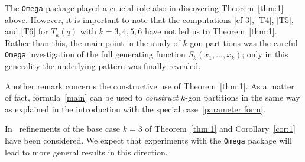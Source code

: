 \documentclass[reqno]{amsart}
\renewcommand{\ttdefault}{cmtex}
\theoremstyle{plain}
\theoremstyle{definition}
\theoremstyle{remark}
\begin{document}
The \texttt{Omega} package played a crucial role also in
discovering Theorem~\ref{thm:1} above. However, it is important to
note that the computations \eqref{cf 3}, \eqref{T4}, \eqref{T5},
and \eqref{T6} for $T_k(q)$ with $k=3,4,5,6$ have not led us
to Theorem~\ref{thm:1}. Rather than this, the main point in the study
of $k$-gon partitions
was the careful \texttt{Omega} investigation of the full
generating function $S_k(x_1,\dots,x_k)$; only in this generality
the underlying pattern was finally revealed.

Another remark concerns the constructive use of Theorem~\ref{thm:1}.
As a matter of fact, formula~\eqref{main} can be used to
\textit{construct} $k$-gon partitions in the same way as
explained in the introduction
with the special case~\eqref{parameter form}.

In~\cite{Andrews:MMPA2} refinements of the base case $k=3$
of Theorem~\ref{thm:1} and Corollary~\ref{cor:1} have been considered. We expect
that experiments
with the \texttt{Omega} package will lead to more general
results in this direction.

\renewcommand{\ttdefault}{cmtt}
\end{document}
